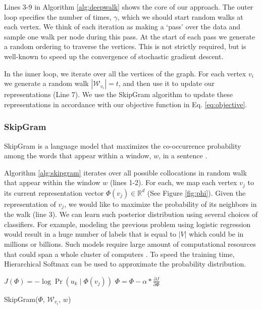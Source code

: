 \documentclass{sig-alternate}
\begin{document}
Lines 3-9 in Algorithm \ref{alg:deepwalk} shows the core of our approach.
The outer loop specifies the number of times, $\mathcal{\gamma}$, which we should start random walks at each vertex.
We think of each iteration as making a `pass' over the data and sample one walk per node during this pass.
At the start of each pass we generate a random ordering to traverse the vertices.  
This is not strictly required, but is well-known to speed up the convergence of stochastic gradient descent.

In the inner loop, we iterate over all the vertices of the graph.  
For each vertex $v_i$ we generate a random walk $|\mathcal{W}_{v_i}| = t$, and then use it to update our representations (Line 7).
We use the SkipGram algorithm \cite{word2vec1} to update these representations in accordance with our objective function in Eq. \ref{eq:objective}.


\subsubsection{SkipGram}
SkipGram is a language model that maximizes the co-occurrence probability among the words that appear within a window, $w$, in a sentence \cite{word2vec1}.

Algorithm \ref{alg:skipgram} iterates over all possible collocations in  random walk that appear within the window $w$ (lines 1-2).
For each, we map each vertex $v_j$ to its current representation vector $\Phi(v_j) \in \mathbb{R}^d$ (See Figure \ref{fig:phi}).
Given the representation of $v_j$, we would like to maximize the probability of its neighbors in the walk (line 3).
We can learn such posterior distribution using several choices of classifiers.
For example, modeling the previous problem using logistic regression would result in a huge number of labels  that is equal to $|V|$ which could be in millions or billions.
Such models require large amount of computational resources that could span a whole cluster of computers \cite{nnlm}.
To speed the training time, Hierarchical Softmax \cite{hsm1,hsm2} can be used to approximate the probability distribution.


\begin{algorithm}[t]
\begin{algorithmic}[1]
				\STATE  $J(\Phi) = - \log{\Pr(u_k \mid \Phi(v_j))}$
	        	\STATE $\Phi = \Phi - \alpha * \frac{\partial J}{\partial \Phi}$
		\ENDFOR

	\ENDFOR

\end{algorithmic}
\caption{SkipGram($\Phi$, $\mathcal{W}_{v_i}$, $w$)}
\label{alg:skipgram}
\end{algorithm}
\end{document}
